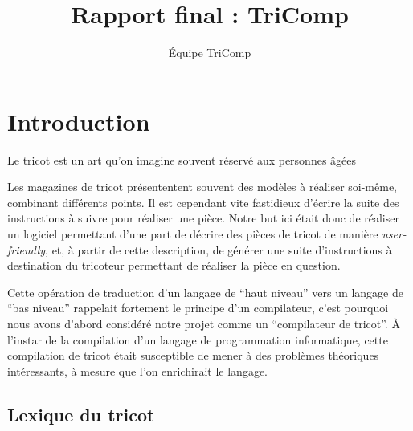 \documentclass{article}
\title{Rapport final : TriComp}
\author{Équipe TriComp}
\date{}
\begin{document}
\maketitle

\newpage

\tableofcontents

\newpage

\section*{Introduction}

Le tricot est un art qu'on imagine souvent réservé aux personnes âgées

Les magazines de tricot présententent souvent des modèles à réaliser soi-même, combinant différents points. Il est cependant vite fastidieux d'écrire la suite des 
instructions à suivre pour réaliser une pièce. Notre but ici était donc de réaliser un logiciel permettant d'une part de décrire des pièces de tricot de manière \emph{user-friendly}, et, à partir de cette description, de générer une suite d'instructions à destination du tricoteur permettant de réaliser la pièce en question. 

Cette opération de traduction d'un langage de ``haut niveau'' vers un langage de ``bas niveau'' rappelait fortement le principe d'un compilateur, c'est pourquoi 
nous avons d'abord considéré notre projet comme un ``compilateur de tricot''. À l'instar de la compilation d'un langage de programmation informatique, cette 
compilation de tricot était susceptible de mener à des problèmes théoriques intéressants, à mesure que l'on enrichirait le langage.

\subsection*{Lexique du tricot} %

\end{document}
